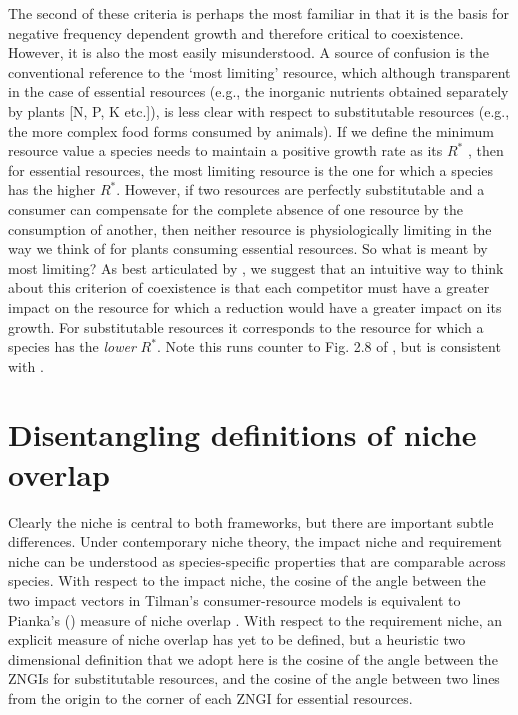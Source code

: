 The second of these criteria is perhaps the most familiar in that it is the basis for negative frequency dependent growth and therefore critical to coexistence. However, it is also the most easily misunderstood. A source of confusion is the conventional reference to the `most limiting' resource, which although transparent in the case of essential resources (e.g., the inorganic nutrients obtained separately by plants [N, P, K etc.]), is less clear with respect to substitutable resources (e.g., the more complex food forms consumed by animals). If we define the minimum resource value a species needs to maintain a positive growth rate as its $R^{*}$ \citep[\textit{sensu}][]{tilman1982}, then for essential resources, the most limiting resource is the one for which a species has the higher $R^{*}$. However, if two resources are perfectly substitutable and a consumer can compensate for the complete absence of one resource by the consumption of another, then neither resource is physiologically limiting in the way we think of for plants consuming essential resources. So what is meant by most limiting? As best articulated by \citet{leon1975}, we suggest that an intuitive way to think about this criterion of coexistence is that each competitor must have a greater impact on the resource for which a reduction would have a greater impact on its growth. For substitutable resources it corresponds to the resource for which a species has the \textit{lower} $R^{*}$. Note this runs counter to Fig. 2.8 of \citet[][see also discussion on p. 34]{Chase2003}, but is consistent with \citet{Leibold1998}.    
\par



\section{Disentangling definitions of niche overlap}
Clearly the niche is central to both frameworks, but there are important subtle differences. Under contemporary niche theory, the impact niche and requirement niche can be understood as species-specific properties that are comparable across species. With respect to the impact niche, the cosine of the angle between the two impact vectors in Tilman's consumer-resource models is equivalent to Pianka's (\citeyear{Pianka1973}) measure of niche overlap \citep{Petraitis1989}. With respect to the requirement niche, an explicit measure of niche overlap has yet to be defined, but a heuristic two dimensional definition that we adopt here is the cosine of the angle between the ZNGIs for substitutable resources, and the cosine of the angle between two lines from the origin to the corner of each ZNGI for essential resources.
\par



